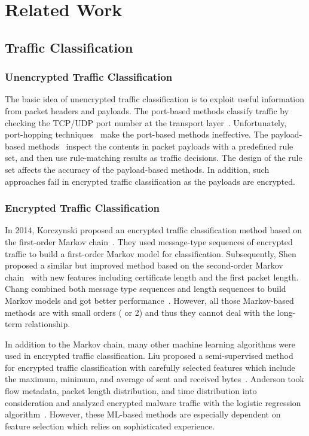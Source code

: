 \section{Related Work}
\label{sec:Related_Work}
\subsection{Traffic Classification}
\subsubsection{Unencrypted Traffic Classification}
The basic idea of unencrypted traffic classification is to exploit useful information from packet headers and payloads. 
The port-based methods classify traffic by checking the TCP/UDP port number at the transport layer~\cite{mcpherson2004portvis}. 
Unfortunately, port-hopping techniques~\cite{constantinou2006identifying} make the port-based methods ineffective. 
The payload-based methods~\cite{finsterbusch2013survey, zhang2013unsupervised} inspect the contents in packet payloads with a predefined rule set, and then use rule-matching results as traffic decisions. The design of the rule set affects the accuracy of the payload-based methods. 
In addition, such approaches fail in encrypted traffic classification as the payloads are encrypted.

\subsubsection{Encrypted Traffic Classification}
In 2014, Korczynski \etal proposed an encrypted traffic classification method based on the first-order Markov chain~\cite{korczynski2014markov}.  
They used message-type sequences of encrypted traffic to build a first-order Markov model for classification. 
Subsequently, Shen \etal proposed a similar but improved method based on the second-order Markov chain~\cite{shen2017classification} with new features including certificate length and the first packet length.  
Chang \etal combined both message type sequences and length sequences to build Markov models and got better performance~\cite{liu2018mampf}.  
However, all those Markov-based methods are with small orders ( or 2) and thus they cannot deal with the long-term relationship.

In addition to the Markov chain, many other machine learning algorithms were used in encrypted traffic classification.  
Liu \etal proposed a semi-supervised method for encrypted traffic classification with carefully selected features which include the maximum, minimum,  and average of sent and received bytes~\cite{liu2012semi}.  
Anderson \etal took flow metadata, packet length distribution,  and time distribution into consideration and analyzed encrypted malware traffic with the logistic regression algorithm~\cite{anderson2018deciphering}. 
However, these ML-based methods are especially dependent on feature selection which relies on sophisticated experience.

